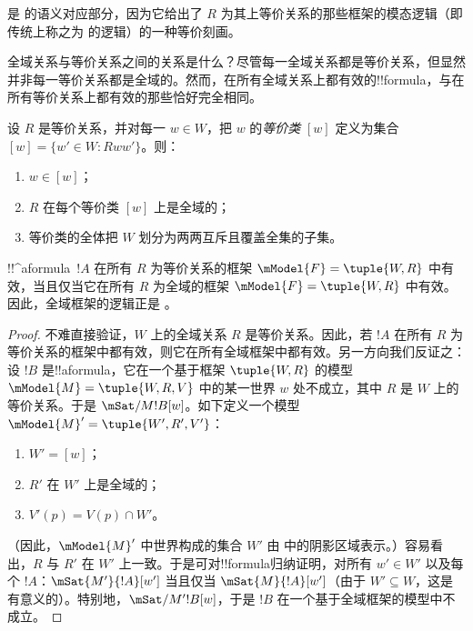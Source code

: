 \documentclass[../../../include/open-logic-section]{subfiles}
\begin{document}
 是  的语义对应部分，因为它给出了 $R$ 为其上等价关系的那些框架的模态逻辑（即传统上称之为  的逻辑）的一种等价刻画。

全域关系与等价关系之间的关系是什么？尽管每一全域关系都是等价关系，但显然并非每一等价关系都是全域的。然而，在所有全域关系上都有效的!!{formula}，与在所有等价关系上都有效的那些恰好完全相同。

\begin{prop}
  设 $R$ 是等价关系，并对每一 $w \in W$，把 $w$ 的\emph{等价类} $[w]$ 定义为集合 $[w] = \{w'\in W : Rww'\}$。则：
  \begin{enumerate}
  \item $w \in [w]$；
  \item $R$ 在每个等价类 $[w]$ 上是全域的；
  \item 等价类的全体把 $W$ 划分为两两互斥且覆盖全集的子集。
  \end{enumerate}
\end{prop}

\begin{prop}
  !!^a{formula}~$!A$ 在所有 $R$ 为等价关系的框架 $\mModel{F} =\tuple{W,R}$ 中有效，当且仅当它在所有 $R$ 为全域的框架 $\mModel{F} =\tuple{W,R}$ 中有效。因此，全域框架的逻辑正是 。
\end{prop}

\begin{proof}
  不难直接验证，$W$ 上的全域关系 $R$ 是等价关系。因此，若 $!A$ 在所有 $R$ 为等价关系的框架中都有效，则它在所有全域框架中都有效。另一方向我们反证之：设 $!B$ 是!!a{formula}，它在一个基于框架 $\tuple{W,R}$ 的模型 $\mModel{M} = \tuple{W, R, V}$ 中的某一世界 $w$ 处不成立，其中 $R$ 是 $W$ 上的等价关系。于是 $\mSat/{M}{!B}[w]$。如下定义一个模型 $\mModel{M}' = \tuple{W', R', V'}$：
  \begin{enumerate}
  \item $W' = [w]$；
  \item $R'$ 在 $W'$ 上是全域的；
  \item $V'(p) = V(p) \cap W'$。
  \end{enumerate}
  （因此，$\mModel{M}'$ 中世界构成的集合 $W'$ 由  中的阴影区域表示。）容易看出，$R$ 与 $R'$ 在 $W'$ 上一致。于是可对!!{formula}归纳证明，对所有 $w' \in W'$ 以及每个 $!A$：$\mSat{M'}{!A}[w']$ 当且仅当 $\mSat{M}{!A}[w']$（由于 $W' \subseteq W$，这是有意义的）。特别地，$\mSat/{M'}{!B}[w]$，于是 $!B$ 在一个基于全域框架的模型中不成立。
\end{proof}
\end{document}
